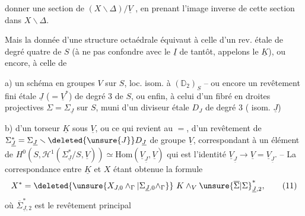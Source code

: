 donner une section de $(X\smallsetminus\Delta)/\underline V$ , en prenant  l'image inverse de cette section dans $X\smallsetminus\Delta$.

Mais la donnée d'une structure octaédrale équivaut à celle d'un  rev. étale de degré quatre de $S$ (à ne pas confondre avec le $\underline I$ de tantôt, appelons le $\underline K$), ou encore, à celle de

a) un schéma en groupes $V$ sur $S$, loc. isom. à $(\mathbb D_2)_S$ -- ou encore un revêtement fini étale $\underline J$ ($=\underline V^*$) de degré 3 de $S$, ou  enfin, à celui d'un  fibré en droites projectives $\Sigma=\Sigma_{\underline J}$ sur $S$, muni d'un diviseur  étale $D_J$ de degré 3 ( isom.   $\underline J$)

b) d'un torseur $\underline K$ sous $\underline V$, ou ce qui revient au $=$, d'un revêtement    de $\Sigma_{\underline J}^*=\Sigma_{\underline J}\smallsetminus\deleted{\unsure{J}}D_{\underline J}$ de groupe $\underline V$,  correspondant à \deleted{$\unsure{\xi}$} un élément de  $H^0(S,\mathcal H^1(\Sigma_{\underline J}^*/S,\underline V))\simeq\mathrm{Hom}(\underline V_{\underline J},\underline V)$  qui est l'identité $\underline V_{\underline J}\longrightarrow \underline V=\underline V_{\underline J}$.
-- La correspondance entre $\underline K$ et $X$ étant obtenue  la formule
\[
 X^*=\deleted{\unsure{X_{J,0}\wedge_{\Gamma}|\Sigma_{\underline J,0}\wedge_{\Gamma}}}\ K\mathbin{\wedge}_{V}\unsure{\overline\Sigma|\Sigma}_{\underline J,2}^*, \tag*{(11)}
\]
où $\overline\Sigma_{\underline J,2}^*$ est le revêtement principal 
